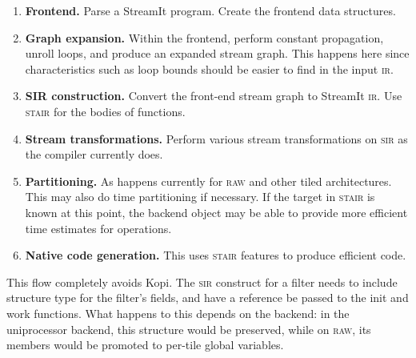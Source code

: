 \documentclass[11pt]{article}
\def\ir{\textsc{ir}}
\def\raw{\textsc{raw}}
\def\sir{\textsc{sir}}
\def\stair{\textsc{stair}}
\begin{document}
\begin{enumerate}
\item \textbf{Frontend.}  Parse a StreamIt program.  Create the
  frontend data structures.
\item \textbf{Graph expansion.}  Within the frontend, perform constant
  propagation, unroll loops, and produce an expanded stream graph.
  This happens here since characteristics such as loop bounds should
  be easier to find in the input \ir.
\item \textbf{SIR construction.}  Convert the front-end stream graph
  to StreamIt \ir.  Use \stair{} for the bodies of functions.
\item \textbf{Stream transformations.}  Perform various stream
  transformations on \sir{} as the compiler currently does.
\item \textbf{Partitioning.}  As happens currently for \raw{} and
  other tiled architectures.  This may also do time partitioning if
  necessary.  If the target in \stair{} is known at this point, the
  backend object may be able to provide more efficient time estimates
  for operations.
\item \textbf{Native code generation.}  This uses \stair{} features to
  produce efficient code.
\end{enumerate}

This flow completely avoids Kopi.  The \sir{} construct for a filter
needs to include structure type for the filter's fields, and have a
reference be passed to the init and work functions.  What happens to
this depends on the backend: in the uniprocessor backend, this
structure would be preserved, while on \raw{}, its members would be
promoted to per-tile global variables.



\end{document}
